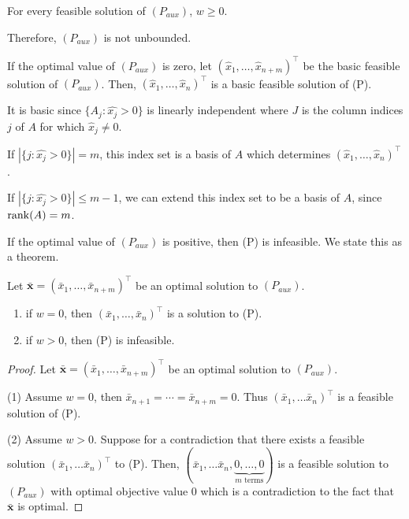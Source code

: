 For every feasible solution of $ (P_{aux}) $, $ w\geqslant  0 $.

Therefore, $ (P_{aux}) $ is not unbounded.

If the optimal value of $ (P_{aux}) $ is zero, let
$ (\hat{x}_1,\ldots,\hat{x}_{n+m})^\top$
be the basic feasible solution of $ (P_{aux}) $. Then,
$ (\hat{x}_1,\ldots,\hat{x}_{n})^\top$
is a basic feasible solution of (P).

It is basic since $ \{A_j : \hat{x_j}>0\} $ is linearly independent where
$ J $ is the column indices $ j $ of $ A $ for which $ \hat{x}_j\neq 0 $.

If $ |\{j:\hat{x_j}>0\}|=m $, this index set is a basis of $ A $ which
determines $ (\hat{x}_1,\ldots,\hat{x}_{n})^\top$.

If $ |\{j:\hat{x_j}>0\}|\leqslant m-1 $, we can extend this index set
to be a basis of $ A $, since $ \operatorname{rank}(A)=m $.

If the optimal value of $ (P_{aux}) $ is positive, then (P) is
infeasible. We state this as a theorem.

\begin{thmbox}
    \begin{theorem}
        Let $ \bar{\bm{x}}=(\bar{x}_1,\ldots ,\bar{x}_{n+m})^\top $ be an optimal solution
        to $ (P_{aux}) $.
        \begin{enumerate}[label=(\arabic*)]
            \item if $ w=0 $, then $ (\bar{x}_1,\ldots,\bar{x}_n)^\top $ is a solution to (P).
            \item if $ w>0 $, then (P) is infeasible.
        \end{enumerate}
    \end{theorem}
\end{thmbox}

\begin{proof}
    Let $ \bar{\bm{x}}=(\bar{x}_1,\ldots ,\bar{x}_{n+m})^\top $ be an optimal solution
    to $ (P_{aux}) $.

    (1) Assume $ w=0 $, then $ \bar{x}_{n+1}=\cdots=\bar{x}_{n+m}=0 $. Thus
    $ (\bar{x}_1,\ldots \bar{x}_n)^\top $ is a feasible solution of (P).

    (2) Assume $ w>0 $. Suppose for a contradiction that there exists a feasible
    solution $(\bar{x}_1,\ldots \bar{x}_n)^\top$ to (P). Then,
    $ (\bar{x}_1,\ldots \bar{x}_n,\underbrace{0,\ldots ,0}_{m\text{ terms}}) $ is a feasible solution to $ (P_{aux}) $
    with optimal objective value $0$ which is a contradiction to the fact that
    $ \bm{\bar{x}} $ is optimal.
\end{proof}


